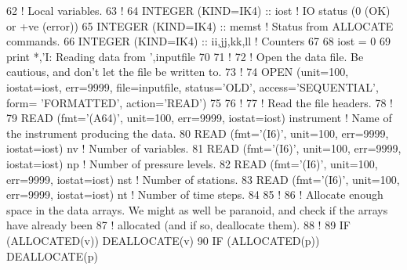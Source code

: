 \begin{DoxyCode}
62     \textcolor{comment}{! Local variables.}
63     \textcolor{comment}{!}
64     \textcolor{keywordtype}{INTEGER (KIND=IK4)}                                                  :: iost         \textcolor{comment}{! IO status (0 (OK)
       or +ve (error))}
65     \textcolor{keywordtype}{INTEGER (KIND=IK4)}                                                  :: memst        \textcolor{comment}{! Status from
       ALLOCATE commands.}
66     \textcolor{keywordtype}{INTEGER (KIND=IK4)}                                                  :: ii,jj,kk,ll  \textcolor{comment}{! Counters}
67 
68     iost = 0
69     print *,\textcolor{stringliteral}{'I: Reading data from '},inputfile
70 
71     \textcolor{comment}{!}
72     \textcolor{comment}{! Open the data file. Be cautious, and don't let the file be written to.}
73     \textcolor{comment}{!}
74     \textcolor{keyword}{OPEN} (unit=100, iostat=iost, err=9999, file=inputfile, status=\textcolor{stringliteral}{'OLD'}, access=\textcolor{stringliteral}{'SEQUENTIAL'}, form=\textcolor{stringliteral}{
      'FORMATTED'}, action=\textcolor{stringliteral}{'READ'})
75 
76     \textcolor{comment}{!}
77     \textcolor{comment}{! Read the file headers.}
78     \textcolor{comment}{!}
79     \textcolor{keyword}{READ} (fmt=\textcolor{stringliteral}{'(A64)'}, unit=100, err=9999, iostat=iost) instrument         \textcolor{comment}{! Name of the instrument
       producing the data.}
80     \textcolor{keyword}{READ} (fmt=\textcolor{stringliteral}{'(I6)'}, unit=100, err=9999, iostat=iost) nv                  \textcolor{comment}{! Number of variables.}
81     \textcolor{keyword}{READ} (fmt=\textcolor{stringliteral}{'(I6)'}, unit=100, err=9999, iostat=iost) np                  \textcolor{comment}{! Number of pressure levels.}
82     \textcolor{keyword}{READ} (fmt=\textcolor{stringliteral}{'(I6)'}, unit=100, err=9999, iostat=iost) nst                 \textcolor{comment}{! Number of stations.}
83     \textcolor{keyword}{READ} (fmt=\textcolor{stringliteral}{'(I6)'}, unit=100, err=9999, iostat=iost) nt                  \textcolor{comment}{! Number of time steps.}
84 
85     \textcolor{comment}{!}
86     \textcolor{comment}{! Allocate enough space in the data arrays. We might as well be paranoid, and check if the arrays have
       already been}
87     \textcolor{comment}{! allocated (and if so, deallocate them).}
88     \textcolor{comment}{!}
89     \textcolor{keywordflow}{IF} (\textcolor{keyword}{ALLOCATED}(v))   \textcolor{keyword}{DEALLOCATE}(v)
90     \textcolor{keywordflow}{IF} (\textcolor{keyword}{ALLOCATED}(p))   \textcolor{keyword}{DEALLOCATE}(p)

\end{DoxyCode}
